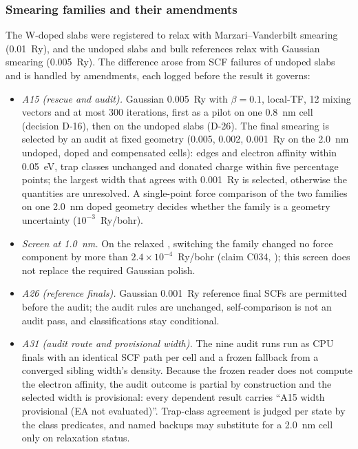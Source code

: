 \subsubsection{Smearing families and their amendments}
\label{sec:m-dft-smearing}

The W-doped slabs were registered to relax with Marzari--Vanderbilt smearing (0.01~Ry), and the undoped slabs and bulk
references relax with Gaussian smearing (0.005~Ry). The difference arose from SCF failures of undoped slabs and is
handled by amendments, each logged before the result it governs:
\begin{itemize}
\item \emph{A15 (rescue and audit).} Gaussian 0.005~Ry with $\beta = 0.1$, local-TF, 12 mixing vectors and at most
300 iterations, first as a pilot on one \SI{0.8}{nm} cell (decision D-16), then on the undoped slabs (D-26). The final
smearing is selected by an audit at fixed geometry (0.005, 0.002, 0.001~Ry on the \SI{2.0}{nm} undoped, doped and
compensated cells): edges and electron affinity within 0.05~eV, trap classes unchanged and donated charge within five
percentage points; the largest width that agrees with 0.001~Ry is selected, otherwise the quantities are unresolved.
A single-point force comparison of the two families on one \SI{2.0}{nm} doped geometry decides whether the family is a
geometry uncertainty ($10^{-3}$~Ry/bohr). %
\item \emph{Screen at \SI{1.0}{nm}.} On the relaxed , switching the family changed no force
component by more than $2.4\times10^{-4}$~Ry/bohr (claim C034, ); this screen does not replace the
required Gaussian polish. %
\item \emph{A26 (reference finals).} Gaussian 0.001~Ry reference final SCFs are permitted before the audit; the audit
rules are unchanged, self-comparison is not an audit pass, and classifications stay conditional. %
\item \emph{A31 (audit route and provisional width).} The nine audit runs run as CPU finals with an identical SCF path
per cell and a frozen fallback from a converged sibling width's density. Because the frozen reader does not compute
the electron affinity, the audit outcome is partial by construction and the selected width is provisional: every
dependent result carries ``A15 width provisional (EA not evaluated)''. Trap-class agreement is judged per state by the
class predicates, and named backups may substitute for a \SI{2.0}{nm} cell only on relaxation status. %

\end{itemize}
